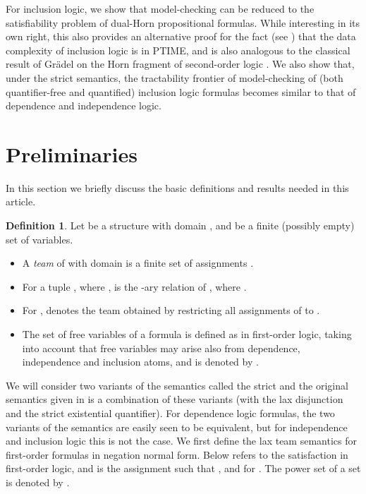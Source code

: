 \documentclass{article}
\theoremstyle{plain}
\theoremstyle{definition}
\newtheorem{definition}[theorem]{Definition}
\begin{document}
For inclusion logic, we  show that model-checking can be reduced to the satisfiability problem of dual-Horn propositional formulas. While interesting in its own right, this also provides an alternative proof for the fact (see \cite{gallhella13}) that the  data complexity of  inclusion logic is in PTIME, and is also analogous  to the classical result of Gr\"adel on the Horn fragment of second-order logic \cite{DBLP:journals/tcs/Gradel92}.  We  also show that, under the strict semantics, the tractability frontier of model-checking of  (both quantifier-free and quantified) inclusion logic formulas becomes similar to that of  dependence and independence logic.



\section{Preliminaries}
In this section we briefly discuss the basic definitions and results needed in this article.
 
 
 \begin{definition}
Let  be a structure with domain , and  be a finite (possibly empty) set  of
variables.
\begin{itemize}
\item A \emph{team}  of  with domain   is a finite set of assignments .
\item For a tuple , where  ,   is the -ary relation of , where .
\item For ,  denotes  the team obtained by restricting all assignments of  to  .
\item  The set of free variables of a formula  is  defined as in first-order logic, taking into account that free variables may arise also from dependence, independence and inclusion atoms, and is denoted by .
\end{itemize}
\end{definition}
We will consider two variants of the semantics called the strict and
the original semantics given in \cite{vaananen07} is a combination of these variants (with the lax disjunction and the strict existential quantifier). For dependence logic formulas, the two variants of the semantics are easily seen to be equivalent, but for independence and inclusion logic this is not the case. We first define the lax  team semantics for first-order formulas in negation normal form. Below   refers to the satisfaction in first-order logic, and  is the assignment such that , and    for . The power set of a set  is denoted by .
\end{document}
